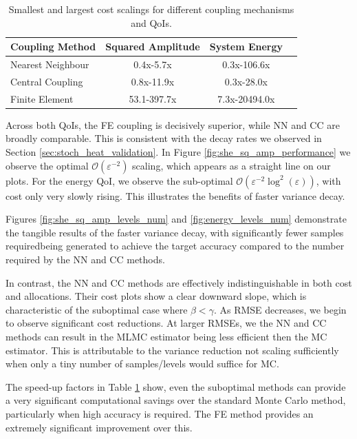 \begin{table}[htbp]
    \centering
    \begin{tabular}{|l|c|c|r|}
        \hline
        \textbf{Coupling Method} & \textbf{Squared Amplitude} & \textbf{System Energy}\\
        \hline
        Nearest Neighbour & 0.4x-5.7x & 0.3x-106.6x \\
        Central Coupling & 0.8x-11.9x & 0.3x-28.0x \\
        Finite Element & 53.1-397.7x & 7.3x-20494.0x \\
        \hline
    \end{tabular}
    \caption{Smallest and largest cost scalings for different coupling mechanisms and QoIs.}
    \label{tab:she_cost_scalings}
\end{table}

Across both QoIs, the FE coupling is decisively superior, while NN and CC are broadly comparable. 
This is consistent with the decay rates we observed in Section 
\ref{sec:stoch_heat_validation}. In Figure 
\ref{fig:she_sq_amp_performance} we observe the optimal 
$\mathcal{O}(\varepsilon^{-2})$ scaling, which appears as a straight line on our plots. For 
the energy QoI, we observe the sub-optimal $\mathcal{O}(\varepsilon^{-2}\log^2(\varepsilon))$,
with cost only very slowly rising. This illustrates the benefits of 
faster variance decay.

Figures \ref{fig:she_sq_amp_levels_num} and \ref{fig:energy_levels_num}
demonstrate the tangible results of the faster variance decay, with significantly
fewer samples requiredbeing generated to achieve the target accuracy compared to the number 
required by the NN and CC methods.

In contrast, the NN and CC methods are effectively indistinguishable
in both cost and allocations.
Their cost plots show a clear downward slope, which is 
characteristic of the suboptimal case where $\beta < \gamma$. As RMSE decreases, 
we begin to observe significant cost reductions.
At larger RMSEs, we the NN and CC methods can result in 
the MLMC estimator being less efficient then the MC estimator. 
This is attributable to the variance reduction not 
scaling sufficiently when only a tiny number of samples/levels 
would suffice for MC.

The speed-up factors in Table 
\ref{tab:she_cost_scalings} show, even the suboptimal methods can provide 
a very significant computational savings over the standard Monte 
Carlo method, particularly when high accuracy is required. The FE method 
provides an extremely significant improvement over this.

